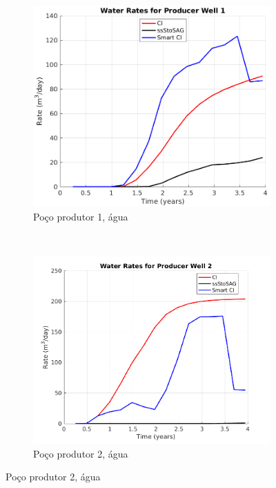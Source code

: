 \begin{figure}[!ht]
	\centering
	\begin{subfigure}[b]{.45\textwidth}
		\includegraphics[width=\textwidth]{figs/resultadosEgg/imgsim5/EGG_WaterWell1_Zoom}
		\caption{Po\c{c}o produtor 1, \'{a}gua}
		\label{EGG5_WaterWell1}
	\end{subfigure}
	~
	\begin{subfigure}[b]{.45\textwidth}
		\includegraphics[width=\textwidth]{figs/resultadosEgg/imgsim5/EGG_WaterWell2_Zoom}
		\caption{Po\c{c}o produtor 2, \'{a}gua}
		\label{EGG5_WaterWell2}
	\end{subfigure}
	

\end{figure}
